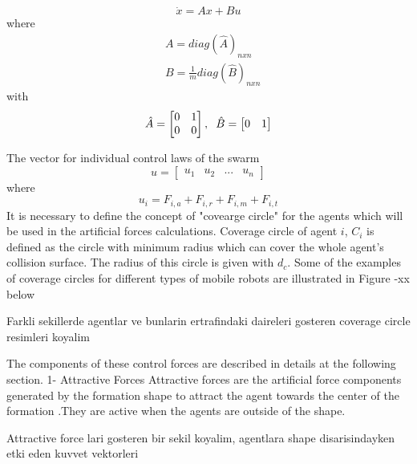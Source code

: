 \documentclass[twoside]{article}
\begin{document}
			\begin{equation}
\dot{x} = Ax + Bu
			\end{equation}
			where
			\begin{align*}
&A = diag\left(\hat{A}\right)_{nxn}\\
&B = \frac{1}{m} diag\left(\hat{B}\right)_{nxn}
			\end{align*}
			with
			\begin{equation}
\hat{A} = \begin{bmatrix}
0&1\\0&0
\end{bmatrix} , \hspace{0.2cm} \hat{B} = \begin{bmatrix}
0&1
\end{bmatrix}
			\end{equation}
			
			The vector for individual control laws of the swarm
			\begin{equation}
u = \begin{bmatrix}
u_1 & u_2 & ... & u_n
\end{bmatrix}
			\end{equation}
			where
			\begin{equation}
u_i = F_{i,a} + F_{i,r} + F_{i,m} + F_{i,t}
			\end{equation}
		It is necessary to define the concept of "covearge circle"	for the agents which will be used in the artificial forces calculations. Coverage circle of agent $i$, $C_i$ is defined as the circle with minimum radius which can cover the whole agent's collision surface. The radius of this circle is given with $d_c$. Some of the examples of coverage circles for different types of mobile robots are illustrated in Figure -xx below
		
		Farkli sekillerde agentlar ve bunlarin ertrafindaki daireleri gosteren coverage circle resimleri koyalim
		
		
		The components of these  control forces are described in details at the following section.
			1- Attractive Forces
			Attractive forces are the artificial force components generated by the formation shape to attract the agent towards the center of the formation .They are active when the agents are outside of the shape. 
			
			Attractive force lari gosteren bir sekil koyalim, agentlara shape disarisindayken etki eden kuvvet vektorleri
\end{document}
